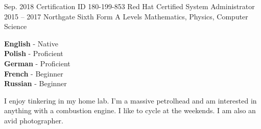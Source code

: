 \documentclass[9pt]{developercv} %
\begin{document}


\begin{entrylist}
	\entry
		{Sep. 2018}
		{Certification ID 180-199-853}
		{Red Hat Certified System Administrator}
    {}
	\entry
		{2015 -- 2017}
		{Northgate Sixth Form}
		{A Levels}
		{Mathematics, Physics, Computer Science}
\end{entrylist}


\begin{minipage}[t]{0.3\textwidth}
	\vspace{-\baselineskip} %

	
	\textbf{English} - Native \\
	\textbf{Polish} - Proficient \\
	\textbf{German} - Proficient \\
  \textbf{French} - Beginner \\
  \textbf{Russian} - Beginner
\end{minipage}
\hfill
\begin{minipage}[t]{0.5\textwidth}
	\vspace{-\baselineskip} %
	
	
	I enjoy tinkering in my home lab. I'm a massive \linebreak petrolhead and am interested in anything with a \linebreak combustion engine. I like to cycle at the weekends. I am also an avid photographer.
\end{minipage}
\hfill
\begin{minipage}[t]{0.5\textwidth}
	\vspace{-\baselineskip} %
\end{minipage}

\end{document}
